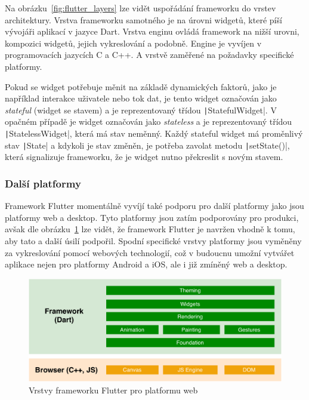 Na obrázku~\ref{fig:flutter_layers} lze vidět uspořádání frameworku do vrstev
architektury.
Vrstva frameworku samotného je na úrovni widgetů,
které píší vývojáři aplikací v jazyce Dart.
Vrstva enginu ovládá framework na nižší urovni, kompozici widgetů,
jejich vykreslování a podobně.
Engine je vyvíjen v programovacích jazycích C a C++.
A vrstvě zaměřené na požadavky specifické
platformy.~\cite{flutter_technical_overview}

Pokud se widget potřebuje měnit na základě dynamických faktorů,
jako je například interakce uživatele nebo tok dat,
je tento widget označován jako \emph{stateful} (widget se stavem) a je
reprezentovaný třídou \texttt|StatefulWidget|.
V opačném případě je widget označován jako \emph{stateless} a je 
reprezentovaný třídou \texttt|StatelessWidget|,
která má stav neměnný.
Každý stateful widget má proměnlivý stav \texttt|State|
a kdykoli je stav změněn,
je potřeba zavolat metodu \texttt|setState()|,
která signalizuje frameworku,
že je widget nutno překreslit s novým stavem.~\cite{flutter_technical_overview}

\subsubsection*{Další platformy}

Framework Flutter momentálně vyvíjí také podporu pro
další platformy jako jsou platformy web a desktop.
Tyto platformy jsou zatím podporovány pro produkci,
avšak dle obrázku~\ref{fig:flutter_layers_web} lze vidět,
že framework Flutter je navržen vhodně k tomu,
aby tato a další úsilí podpořil.
Spodní specifické vrstvy platformy jsou vyměněny za vykreslování pomocí
webových technologií,
což v budoucnu umožní vytvářet aplikace nejen pro platformy Android a iOS,
ale i již zmíněný web a desktop.~\cite{flutter_web, flutter_desktop} 

\begin{figure}[ht!]
    \centering
    \includegraphics[width=\linewidth]{assets/technology-research/framework/flutter_overview_web.pdf}
    \caption{Vrstvy frameworku Flutter pro platformu web~\cite{flutter_web}}
    \label{fig:flutter_layers_web}
\end{figure}

